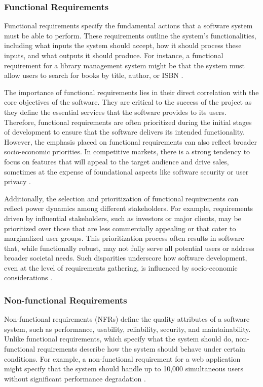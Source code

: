 \begin{refsection}
\subsubsection{Functional Requirements}

Functional requirements specify the fundamental actions that a software system must be able to perform. These requirements outline the system's functionalities, including what inputs the system should accept, how it should process these inputs, and what outputs it should produce. For instance, a functional requirement for a library management system might be that the system must allow users to search for books by title, author, or ISBN \cite[pp.~85-110]{wiegers2013software}.

The importance of functional requirements lies in their direct correlation with the core objectives of the software. They are critical to the success of the project as they define the essential services that the software provides to its users. Therefore, functional requirements are often prioritized during the initial stages of development to ensure that the software delivers its intended functionality. However, the emphasis placed on functional requirements can also reflect broader socio-economic priorities. In competitive markets, there is a strong tendency to focus on features that will appeal to the target audience and drive sales, sometimes at the expense of foundational aspects like software security or user privacy \cite[pp.~101-120]{pressman2019software}.

Additionally, the selection and prioritization of functional requirements can reflect power dynamics among different stakeholders. For example, requirements driven by influential stakeholders, such as investors or major clients, may be prioritized over those that are less commercially appealing or that cater to marginalized user groups. This prioritization process often results in software that, while functionally robust, may not fully serve all potential users or address broader societal needs. Such disparities underscore how software development, even at the level of requirements gathering, is influenced by socio-economic considerations \cite[pp.~3-18]{pohl2010requirements}.

\subsubsection{Non-functional Requirements}

Non-functional requirements (NFRs) define the quality attributes of a software system, such as performance, usability, reliability, security, and maintainability. Unlike functional requirements, which specify what the system should do, non-functional requirements describe how the system should behave under certain conditions. For example, a non-functional requirement for a web application might specify that the system should handle up to 10,000 simultaneous users without significant performance degradation \cite[pp.~35-60]{bass2021software}.


\end{refsection}
